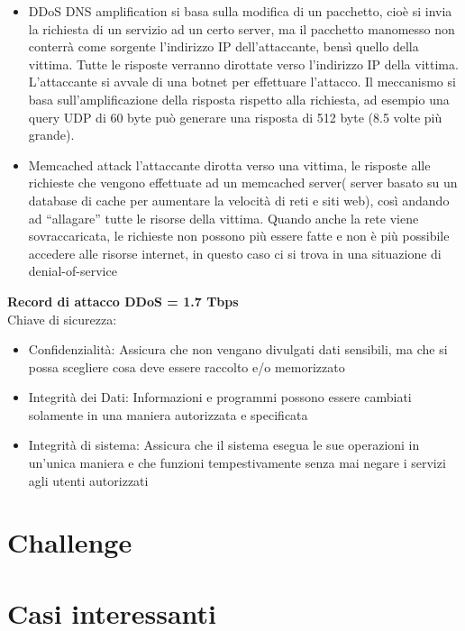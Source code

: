 \documentclass{article}
\begin{document}
\begin{itemize}
    \item DDoS DNS amplification si basa sulla modifica di un pacchetto, cioè si invia la richiesta di un servizio ad un certo server, 
    ma il pacchetto manomesso non conterrà come sorgente l’indirizzo IP dell’attaccante, bensì quello della vittima. Tutte le risposte 
    verranno dirottate verso l’indirizzo IP della vittima. L’attaccante si avvale di una botnet per effettuare l’attacco. Il meccanismo 
    si basa sull’amplificazione della risposta rispetto alla richiesta, ad esempio una query UDP di 60 byte può generare una risposta 
    di 512 byte (8.5 volte più grande).
    \item Memcached attack l’attaccante dirotta verso una vittima, le risposte alle richieste che vengono effettuate ad un memcached 
    server( server basato su un database di cache per aumentare la velocità di reti e siti web), così andando ad “allagare” tutte le 
    risorse della vittima. Quando anche la rete viene sovraccaricata, le richieste non possono più essere fatte e non è più possibile 
    accedere alle risorse internet, in questo caso ci si trova in una situazione di denial-of-service
\end{itemize}
\textbf{Record di attacco DDoS = 1.7 Tbps} \\
Chiave di sicurezza:
\begin{itemize}
    \item Confidenzialità: Assicura che non vengano divulgati dati sensibili, ma che si possa scegliere cosa deve essere raccolto e/o memorizzato
    \item Integrità dei Dati: Informazioni e programmi possono essere cambiati solamente in una maniera autorizzata e specificata
    \item Integrità di sistema: Assicura che il sistema esegua le sue operazioni in un’unica maniera e che funzioni tempestivamente senza mai 
    negare i servizi agli utenti autorizzati
\end{itemize}
\section{Challenge}

\section{Casi interessanti}
\end{document}
